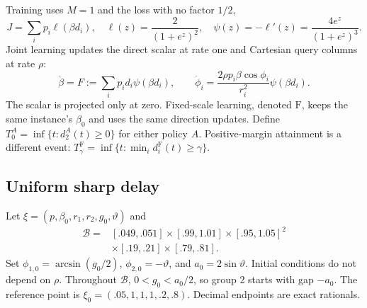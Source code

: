 \documentclass[10pt,a4paper]{article}
\newcommand{\B}{\mathcal B}
\newcommand{\F}{\mathrm F}
\begin{document}
Training uses $M=1$ and the loss with no factor $1/2$,
\begin{equation}
J=\sum_i p_i\ell(\beta d_i),\quad
\ell(z)=\frac{2}{(1+e^z)^2},\quad
\psi(z)=-\ell'(z)=\frac{4e^z}{(1+e^z)^3}.
\label{eq:copyloss}
\end{equation}
Joint learning updates the direct scalar at rate one and Cartesian query columns at rate $\rho$:
\begin{equation}
\dot\beta=F:=\sum_i p_i d_i\psi(\beta d_i),\qquad
\dot\phi_i=\frac{2\rho p_i\beta\cos\phi_i}{r_i^2}\psi(\beta d_i).
\label{eq:flow}
\end{equation}
The scalar is projected only at zero. Fixed-scale learning, denoted $\F$, keeps the same instance's $\beta_0$ and uses the same direction updates. Define $T_0^A=\inf\{t:d_2^A(t)\ge0\}$ for either policy $A$. Positive-margin attainment is a different event: $T_\gamma^\F=\inf\{t:\min_i d_i^\F(t)\ge\gamma\}$.

\subsection{Uniform sharp delay}
Let $\xi=(p,\beta_0,r_1,r_2,g_0,\vartheta)$ and
\begin{equation}
\begin{split}
\B={}&[.049,.051]\times[.99,1.01]\times[.95,1.05]^2\\[-2pt]
&\times[.19,.21]\times[.79,.81].
\end{split}\label{eq:box}
\end{equation}
Set $\phi_{1,0}=\arcsin(g_0/2)$, $\phi_{2,0}=-\vartheta$, and $a_0=2\sin\vartheta$. Initial conditions do not depend on $\rho$. Throughout $\B$, $0<g_0<a_0/2$, so group 2 starts with gap $-a_0$. The reference point is $\xi_0=(.05,1,1,1,.2,.8)$. Decimal endpoints are exact rationals.
\end{document}
